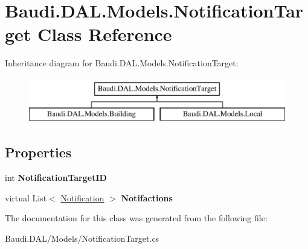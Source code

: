 \hypertarget{class_baudi_1_1_d_a_l_1_1_models_1_1_notification_target}{}\section{Baudi.\+D\+A\+L.\+Models.\+Notification\+Target Class Reference}
\label{class_baudi_1_1_d_a_l_1_1_models_1_1_notification_target}
Inheritance diagram for Baudi.\+D\+A\+L.\+Models.\+Notification\+Target\+:\begin{figure}[H]
\begin{center}
\leavevmode
\includegraphics[height=2.000000cm]{class_baudi_1_1_d_a_l_1_1_models_1_1_notification_target}
\end{center}
\end{figure}
\subsection*{Properties}
\begin{DoxyCompactItemize}
\item 
\hypertarget{class_baudi_1_1_d_a_l_1_1_models_1_1_notification_target_a26244804491276829ac3bc42400170f4}{}int {\bfseries Notification\+Target\+I\+D}\label{class_baudi_1_1_d_a_l_1_1_models_1_1_notification_target_a26244804491276829ac3bc42400170f4}

\item 
\hypertarget{class_baudi_1_1_d_a_l_1_1_models_1_1_notification_target_a8d540f787cc33f23b81978e22d79a1f5}{}virtual List$<$ \hyperlink{class_baudi_1_1_d_a_l_1_1_models_1_1_notification}{Notification} $>$ {\bfseries Notifactions}\label{class_baudi_1_1_d_a_l_1_1_models_1_1_notification_target_a8d540f787cc33f23b81978e22d79a1f5}

\end{DoxyCompactItemize}


The documentation for this class was generated from the following file\+:\begin{DoxyCompactItemize}
\item 
Baudi.\+D\+A\+L/\+Models/Notification\+Target.\+cs\end{DoxyCompactItemize}
